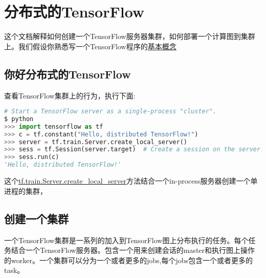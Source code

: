 \section{分布式的TensorFlow}\label{sec:分布式TensorFlow}
这个文档解释如何创建一个TensorFlow服务器集群，如何部署一个计算图到集群上。我们假设你熟悉写一个TensorFlow程序的\href{https://www.tensorflow.org/get_started/get_started?hl=zh-cn}{基本概念}
\subsection{你好分布式的TensorFlow}
查看TensorFlow集群上的行为，执行下面:
\begin{lstlisting}[language=Python]
# Start a TensorFlow server as a single-process "cluster".
$ python
>>> import tensorflow as tf
>>> c = tf.constant("Hello, distributed TensorFlow!")
>>> server = tf.train.Server.create_local_server()
>>> sess = tf.Session(server.target)  # Create a session on the server.
>>> sess.run(c)
'Hello, distributed TensorFlow!'
\end{lstlisting}
这个\href{https://www.tensorflow.org/api_docs/python/tf/train/Server?hl=zh-cn#create_local_server}{tf.train.Server.create\_local\_server}方法结合一个in-process服务器创建一个单进程的集群，
\subsection{创建一个集群}
一个TensorFlow集群是一系列的加入到TensorFlow图上分布执行的任务。每个任务结合一个TensorFlow服务器。包含一个用来创建会话的master和执行图上操作的worker。一个集群可以分为一个或者更多的jobs,每个jobs包含一个或者更多的task。

